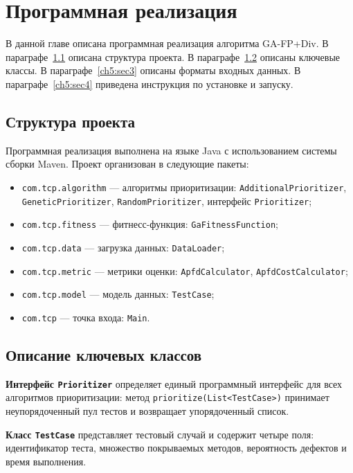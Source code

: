 \chapter{Программная реализация} \label{ch5}

В данной главе описана программная реализация алгоритма GA-FP+Div. 
В параграфе~\ref{ch5:sec1} описана структура проекта. 
В параграфе~\ref{ch5:sec2} описаны ключевые классы. 
В параграфе~\ref{ch5:sec3} описаны форматы входных данных. 
В параграфе~\ref{ch5:sec4} приведена инструкция по установке и запуску.

\section{Структура проекта} \label{ch5:sec1}

Программная реализация выполнена на языке Java с использованием системы сборки Maven. 
Проект организован в следующие пакеты:

\begin{itemize}
    \item \texttt{com.tcp.algorithm} --- алгоритмы приоритизации: 
    \texttt{AdditionalPrioritizer}, \texttt{GeneticPrioritizer}, \texttt{RandomPrioritizer}, интерфейс \texttt{Prioritizer};
    \item \texttt{com.tcp.fitness} --- фитнесс-функция: \texttt{GaFitnessFunction};
    \item \texttt{com.tcp.data} --- загрузка данных: \texttt{DataLoader};
    \item \texttt{com.tcp.metric} --- метрики оценки: \texttt{ApfdCalculator}, \texttt{ApfdCostCalculator};
    \item \texttt{com.tcp.model} --- модель данных: \texttt{TestCase};
    \item \texttt{com.tcp} --- точка входа: \texttt{Main}.
\end{itemize}

\section{Описание ключевых классов} \label{ch5:sec2}

\textbf{Интерфейс \texttt{Prioritizer}} определяет единый программный интерфейс для всех алгоритмов 
приоритизации: метод \texttt{prioritize(List<TestCase>)} принимает неупорядоченный пул тестов и 
возвращает упорядоченный список.

\textbf{Класс \texttt{TestCase}} представляет тестовый случай и содержит четыре поля: идентификатор теста, 
множество покрываемых методов, вероятность дефектов и время выполнения.

